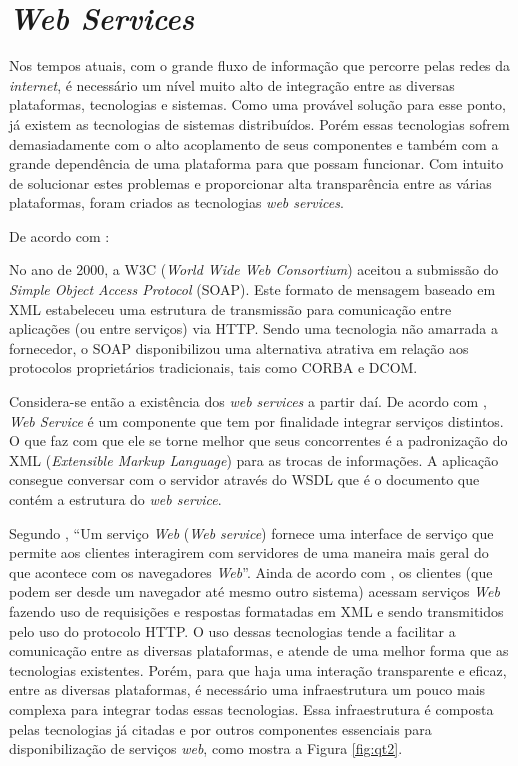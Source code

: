 \section{\textit{Web Services}}
	
	\par Nos tempos atuais, com o grande fluxo de informação que percorre pelas
redes da \textit{internet}, é necessário um nível muito alto de integração entre
as diversas plataformas, tecnologias e sistemas. Como uma provável solução para
esse ponto, já existem as tecnologias de sistemas distribuídos. Porém essas
tecnologias sofrem demasiadamente com o alto acoplamento de seus componentes e
também com a grande dependência de uma plataforma para que possam funcionar. Com
intuito de solucionar estes problemas e proporcionar alta transparência entre
as várias plataformas, foram criados as tecnologias \textit{web services}.
	
	
	\par De acordo com :
	\begin{citacao}
		No ano de 2000, a W3C (\textit{World Wide Web Consortium}) aceitou a submissão
		do \textit{Simple Object Access Protocol} (SOAP). Este formato de mensagem
		baseado em XML estabeleceu uma estrutura de transmissão para comunicação entre
		aplicações (ou entre serviços) via HTTP. Sendo uma tecnologia não amarrada a
		fornecedor, o SOAP disponibilizou uma alternativa atrativa em relação aos
		protocolos proprietários tradicionais, tais como CORBA e DCOM.
	\end{citacao}
	
	\par Considera-se então a existência dos \textit{web services} a partir daí. De
acordo com , \textit{Web Service} é um componente que
tem por finalidade integrar serviços distintos. O que faz com que ele se torne
melhor que seus concorrentes é a padronização do XML (\textit{Extensible Markup
Language}) para as trocas de informações. A aplicação consegue conversar com o
servidor através do  WSDL que é o documento que contém a estrutura do 
\textit{web service}.
	
	\par Segundo , “Um serviço \textit{Web} (\textit{Web
service}) fornece uma interface de serviço que permite aos clientes interagirem
com servidores de uma maneira mais geral do que acontece com os navegadores
\textit{Web}”. Ainda de acordo com , os clientes (que
podem ser desde um navegador até mesmo outro sistema) acessam serviços 
\textit{Web} fazendo uso de requisições e respostas formatadas em XML e sendo
transmitidos pelo uso do protocolo HTTP. O uso dessas tecnologias tende a
facilitar a comunicação entre as diversas plataformas, e atende de uma
melhor forma que as tecnologias existentes. Porém, para que haja uma
interação transparente e eficaz, entre as diversas plataformas, é necessário uma
infraestrutura um pouco mais complexa para integrar todas essas tecnologias.
Essa infraestrutura é composta pelas tecnologias já citadas e por outros
componentes essenciais para disponibilização de serviços \textit{web}, como
mostra a Figura \ref{fig:qt2}.

